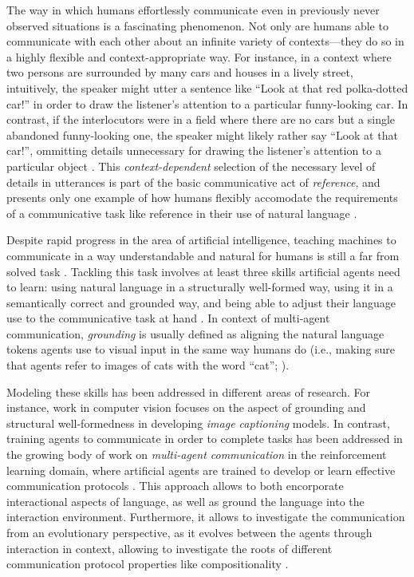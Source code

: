 The way in which humans effortlessly communicate even in previously never observed situations is a fascinating phenomenon. Not only are humans able to communicate with each other about an infinite variety of contexts---they do so in a highly flexible and context-appropriate way. For instance, in a context where two persons are surrounded by many cars and houses in a lively street, intuitively, the speaker might utter a sentence like ``Look at that red polka-dotted car!'' in order to draw the listener's attention to a particular funny-looking car. In contrast, if the interlocutors were in a field where there are no cars but a single abandoned funny-looking one, the speaker might likely rather say ``Look at that car!'', ommitting details unnecessary for drawing the listener's attention to a particular object \parencite[cf.][]{graf2016animal, degen2020redundancy}. This \textit{context-dependent} selection of the necessary level of details in utterances is part of the basic communicative act of \textit{reference}, and presents only one example of how humans flexibly accomodate the requirements of a communicative task like reference in their use of natural language \parencite{searle1969speech, grice1975logic}.

Despite rapid progress in the area of artificial intelligence, teaching machines to communicate in a way understandable and natural for humans is still a far from solved task \parencite{lazaridou2020emergent, lake2017building, lecun2015deep}. Tackling this task involves at least three skills artificial agents need to learn: using natural language in a structurally well-formed way, using it in a semantically correct and grounded way, and being able to adjust their language use to the communicative task at hand \parencite{lazaridou2020emergent}. In context of multi-agent communication, \textit{grounding} is usually defined as aligning the natural language tokens agents use to visual input in the same way humans do (i.e., making sure that agents refer to images of cats with the word ``cat''; \cite{jurafsky2000speech}).

Modeling these skills has been addressed in different areas of research. For instance, work in computer vision focuses on the aspect of grounding and structural well-formedness in developing \textit{image captioning} models.
In contrast, training agents to communicate in order to complete tasks has been addressed in the growing body of work on \textit{multi-agent communication} in the reinforcement learning domain, where artificial agents are trained to develop or learn effective communication protocols \parencite[e.g.,][]{foerster2016learning, lazaridou2020emergent}.
This approach allows to both encorporate interactional aspects of language, as well as ground the language into the interaction environment. Furthermore, it allows to investigate the communication from an evolutionary perspective, as it evolves between the agents through interaction in context, allowing to investigate the roots of different communication protocol properties like compositionality \parencite{lazaridou2020emergent}. 

